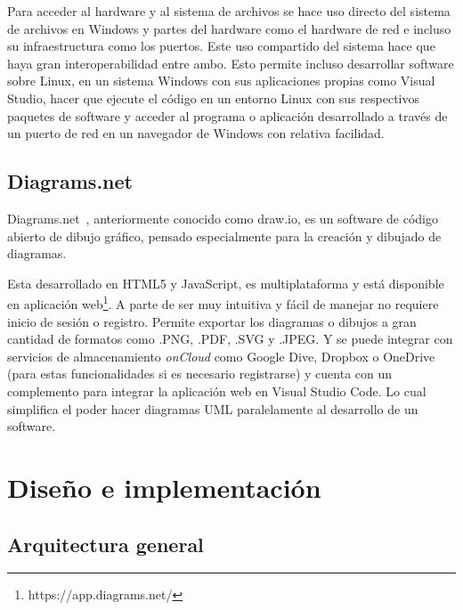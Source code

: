 \documentclass[a4paper, 12pt]{book}
\begin{document}
Para acceder al hardware y al sistema de archivos se hace uso directo del sistema de archivos en Windows y partes del hardware como el hardware de red e incluso su infraestructura como los puertos. Este uso compartido del sistema hace que haya gran interoperabilidad entre ambo. Esto permite incluso desarrollar software sobre Linux, en un sistema Windows con sus aplicaciones propias como Visual Studio, hacer que ejecute el código en un entorno Linux con sus respectivos paquetes de software y acceder al programa o aplicación desarrollado a través de un puerto de red en un navegador de Windows con relativa facilidad. 

\section{Diagrams.net}
Diagrams.net~\cite{diagrams.net}, anteriormente conocido como draw.io, es un software de código abierto de dibujo gráfico, pensado especialmente para la creación y dibujado de diagramas.

Esta desarrollado en HTML5 y JavaScript, es multiplataforma y está disponible en aplicación web\footnote{https://app.diagrams.net/}. A parte de ser muy intuitiva y fácil de manejar no requiere inicio de sesión o registro. Permite exportar los diagramas o dibujos a gran cantidad de formatos como .PNG, .PDF, .SVG y .JPEG. Y se puede integrar con servicios de almacenamiento \emph{onCloud} como Google Dive, Dropbox o OneDrive (para estas funcionalidades si es necesario registrarse) y cuenta con un complemento para integrar la aplicación web en Visual Studio Code. Lo cual simplifica el poder hacer diagramas UML paralelamente al desarrollo de un software.



\chapter{Diseño e implementación}
\label{chap:diseño}


\section{Arquitectura general} 
\label{sec:arquitectura}
\end{document}

